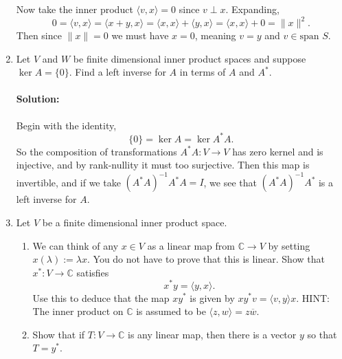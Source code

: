 \documentclass{article}
\begin{document}
\begin{enumerate}
Now take the inner product $\langle v,x \rangle=0$ since $v\perp x$. Expanding,
\[
0=\langle v,x \rangle=\langle x+y,x \rangle=\langle x,x \rangle+\langle y,x \rangle=\langle x,x \rangle+0=\|x\|^2
.\] 
Then since $\|x\|=0$ we must have $x=0$, meaning $v=y$ and $v\in \text{span }S$.

\item Let $V$ and $W$ be finite dimensional inner product spaces and suppose $\ker A = \{0\}$. Find a left inverse for $A$ in terms of $A$ and $A^*$.

\paragraph{Solution: } Begin with the identity,
\[ \{0\} =\ker A =\ker A^* A .\] 
So the composition of transformations $A^* A:V\to V$ has zero kernel and is injective, and by rank-nullity it must too surjective. Then this map is invertible, and if we take $(A^* A)^{-1}A^* A=I$, we see that $(A^* A)^{-1}A^* $ is a left inverse for $A$.

\newpage
\item Let $V$ be a finite dimensional inner product space.
\begin{enumerate}[label= (\alph*)] 
\item We can think of any $x \in V$ as a linear map from $\mathbb{C} \to V$ by setting $x(\lambda) := \lambda x$. You do not have to prove that this is linear. Show that $x^*: V \to \mathbb{C}$ satisfies
$$x^* y = \langle y, x\rangle.$$
Use this to deduce that the map $xy^*$ is given by $xy^* v = \langle v, y\rangle x$.
HINT: The inner product on $\mathbb{C}$ is assumed to be $\langle z, w\rangle = z\overline{w}$.
\item Show that if $T: V \to \mathbb{C}$ is any linear map, then there is a vector $y$ so that $T = y^*$.
\end{enumerate}

\end{enumerate}
\end{document}
